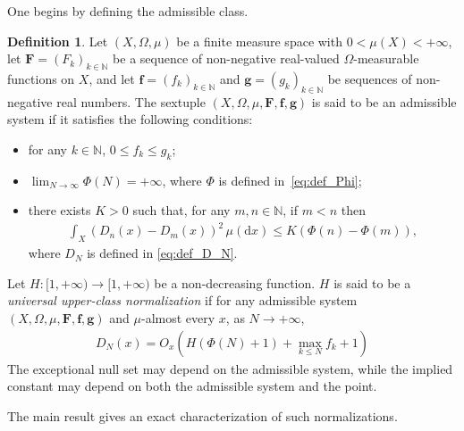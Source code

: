 \documentclass[12pt,reqno]{amsart}
\theoremstyle{definition}
\newtheorem*{defi}{Definition}
\theoremstyle{plain}
\begin{document}
One begins by defining the admissible class.
\begin{defi}
Let $(X,\Omega,\mu)$ be a finite measure space with $0<\mu(X)<+\infty$, let $\mathbf{F}=(F_k)_{k\in\mathbb{N}}$ be a sequence of non-negative real-valued $\Omega$-measurable functions on $X$, and let $\mathbf{f}=(f_k)_{k\in\mathbb{N}}$ and $\mathbf{g}=(g_k)_{k\in\mathbb{N}}$ be sequences of non-negative real numbers. The sextuple $(X,\Omega,\mu,\mathbf{F},\mathbf{f},\mathbf{g})$ is said to be an admissible system if it satisfies the following conditions:
\begin{itemize}
    \item for any $k\in\mathbb{N}$, $0\leq f_k\leq g_k$;
    \item $\lim_{N\to\infty}\Phi(N)=+\infty$, where $\Phi$ is defined in~\eqref{eq:def_Phi};
    \item there exists $K>0$ such that, for any $m,n\in\mathbb{N}$, if $m<n$ then
    \begin{align}
    \label{eq:block-L2}
        \int_X\left(D_n(x)-D_m(x)\right)^2\,\mu(\mathrm{d}x)
        \leq K\left(\Phi(n)-\Phi(m)\right),
    \end{align}
    where $D_N$ is defined in \eqref{eq:def_D_N}.
\end{itemize}

Let $H:[1,+\infty)\to[1,+\infty)$ be a non-decreasing function. $H$ is said to be a \emph{universal upper-class normalization} if for any admissible system $(X,\Omega,\mu,\mathbf{F},\mathbf{f},\mathbf{g})$ and $\mu$-almost every $x$, as $N\to+\infty$,
\begin{align}
\label{eq:universal-upper-class}
    D_N(x)
    =O_x\!\left( H(\Phi(N)+1)+\max_{k\leq N} f_k+1 \right)
\end{align}
The exceptional null set may depend on the admissible system, while the implied constant may depend on both the admissible system and the point.
\end{defi}

The main result gives an exact characterization of such normalizations. 
\end{document}
